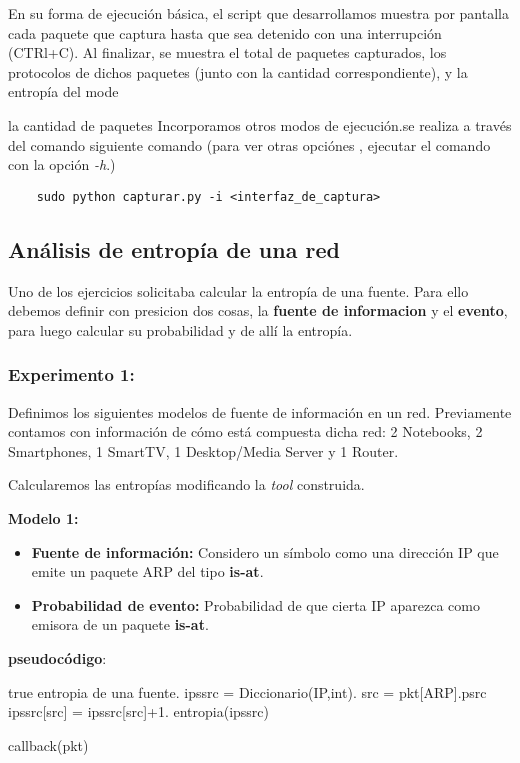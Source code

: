En su forma de ejecución básica, el script que desarrollamos muestra por pantalla cada paquete que captura hasta que sea detenido con una interrupción (CTRl+C). Al finalizar, se muestra el total de paquetes capturados, los protocolos de dichos paquetes (junto con la cantidad correspondiente), y la entropía del mode

 la cantidad de paquetes  Incorporamos otros modos de ejecución.se realiza a través del comando siguiente comando (para ver otras opciónes , ejecutar el comando con la opción \textit{-h}.)

\begin{verbatim}
	sudo python capturar.py -i <interfaz_de_captura>
\end{verbatim}



\subsection{Análisis de entropía de una red}
Uno de los ejercicios solicitaba calcular la entropía de una fuente.
Para ello debemos definir con presicion dos cosas, la \textbf{fuente de informacion} y el \textbf{evento}, para luego calcular su probabilidad
y de allí la entropía.

\subsubsection{Experimento 1:}

Definimos los siguientes modelos de fuente de información en un red. Previamente contamos con información de cómo está compuesta dicha red: 2 Notebooks, 2 Smartphones, 1 SmartTV, 1 Desktop/Media Server y 1 Router.

Calcularemos las entropías modificando la \textit{tool} construida. 

\textbf{Modelo 1:}
\begin{itemize}
\item \textbf{Fuente de información:} Considero un símbolo como una dirección IP que emite un paquete ARP del tipo \textbf{is-at}.
\item \textbf{Probabilidad de evento:} Probabilidad de que cierta IP aparezca como emisora de un paquete \textbf{is-at}.
\end{itemize}

\newpage
\textbf{pseudocódigo}:
\begin{algorithm}
\begin{algorithmic}
\REQUIRE true
\ENSURE entropia de una fuente.
\STATE ipssrc = Diccionario(IP,int).
\STATE src = pkt[ARP].psrc
\STATE ipssrc[src] = ipssrc[src]+1.
\ENDIF
\RETURN entropia(ipssrc)
\end{algorithmic}
\caption{callback(pkt)}
\end{algorithm}


